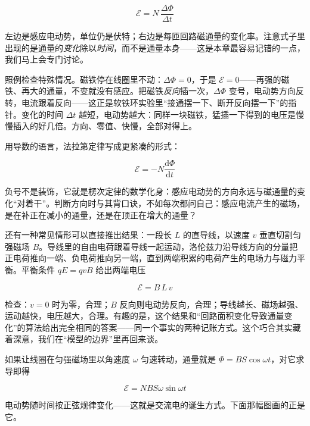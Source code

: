 \[
\mathcal{E} = N\,\frac{\Delta\Phi}{\Delta t}
\]

左边是感应电动势，单位仍是伏特；右边是每匝回路磁通量的变化率。注意式子里出现的是通量的\emph{变化}除以\emph{时间}，而不是通量本身——这是本章最容易记错的一点，我们马上会专门讨论。

照例检查特殊情况。磁铁停在线圈里不动：\(\Delta\Phi=0\)，于是 \(\mathcal{E}=0\)——再强的磁铁、再大的通量，不变就没有感应。把磁铁\emph{反向}插一次，\(\Delta\Phi\) 变号，电动势方向反转，电流跟着反向——这正是软铁环实验里“接通摆一下、断开反向摆一下”的指针。变化的时间 \(\Delta t\) 越短，电动势越大：同样一块磁铁，猛插一下得到的电压是慢慢插入的好几倍。方向、零值、快慢，全部对得上。

\begin{mathbridge}
用导数的语言，法拉第定律写成更紧凑的形式：

\[
\mathcal{E} = -N\frac{\mathrm{d}\Phi}{\mathrm{d}t}
\]

负号不是装饰，它就是楞次定律的数学化身：感应电动势的方向永远与磁通量的变化“对着干”。判断方向时与其背口诀，不如每次都问自己：感应电流产生的磁场，是在补正在减小的通量，还是在顶正在增大的通量？

还有一种常见情形可以直接推出结果：一段长 \(L\) 的直导线，以速度 \(v\) 垂直切割匀强磁场 \(B\)。导线里的自由电荷跟着导线一起运动，洛伦兹力沿导线方向的分量把正电荷推向一端、负电荷推向另一端，直到两端积累的电荷产生的电场力与磁力平衡。平衡条件 \(qE=qvB\) 给出两端电压

\[
\mathcal{E} = B\,L\,v
\]

检查：\(v=0\) 时为零，合理；\(B\) 反向则电动势反向，合理；导线越长、磁场越强、运动越快，电压越大，合理。有趣的是，这个结果和“回路面积变化导致通量变化”的算法给出完全相同的答案——同一个事实的两种记账方式。这个巧合其实藏着深意，我们在“模型的边界”里再回来谈。

如果让线圈在匀强磁场里以角速度 \(\omega\) 匀速转动，通量就是 \(\Phi=BS\cos\omega t\)，对它求导即得

\[
\mathcal{E} = NBS\omega\sin\omega t
\]

电动势随时间按正弦规律变化——这就是交流电的诞生方式。下面那幅图画的正是它。
\end{mathbridge}

\begin{center}
\end{center}

